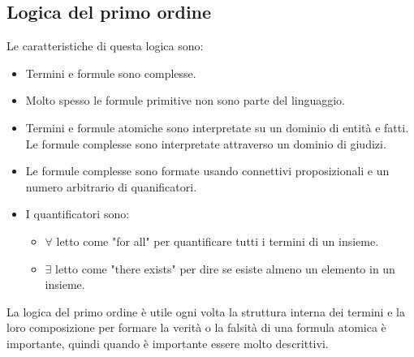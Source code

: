 \documentclass[../main.tex]{subfiles}
\begin{document}
    \subsection{Logica del primo ordine}
    Le caratteristiche di questa logica sono:
    \begin{itemize}
        \item Termini e formule sono complesse.
        \item Molto spesso le formule primitive non sono parte del linguaggio.
        \item Termini e formule atomiche sono interpretate su un dominio di entità e fatti.\\
            Le formule complesse sono interpretate attraverso un dominio di giudizi.
        \item Le formule complesse sono formate usando connettivi proposizionali e un numero arbitrario di quanificatori.
        \item I quantificatori sono:
        \begin{itemize}
            \item $\forall$ letto come "for all" per quantificare tutti i termini di un insieme.
            \item $\exists$ letto come "there exists" per dire se esiste almeno un elemento in un insieme.
        \end{itemize}
    \end{itemize}
    La logica del primo ordine è utile ogni volta la struttura interna dei termini e la loro composizione per formare la verità o la falsità di una formula atomica è importante, quindi quando è importante essere molto descrittivi.
\end{document}

